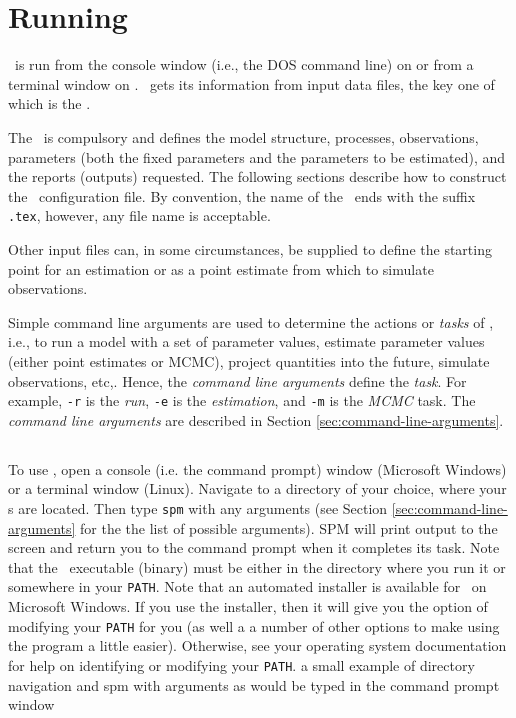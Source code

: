 \section{Running \iSAM\label{sec:running-sam}}
\CH
\iSAM\ is run from the console window (i.e., the DOS command line) on  or from a terminal window on . \iSAM\ gets its information from input data files, the key one of which is the \config{}. 

The \config\ is compulsory and defines the model structure, processes, observations, parameters (both the fixed parameters and the parameters to be estimated), and the reports (outputs) requested. The following sections  describe how to construct the \iSAM\ configuration file. By convention, the name of the \config\ ends with the suffix \texttt{.tex}, however, any file name is acceptable.

Other input files can, in some circumstances, be supplied to define the starting point for an estimation %
or as a point estimate from which to simulate observations.

Simple command line arguments are used to determine the actions or \emph{tasks} of \iSAM, i.e., to run a model with a set of parameter values, estimate parameter values (either point estimates or MCMC), project quantities into the future, simulate observations, etc,. Hence, the \emph{command line arguments} define the \emph{task}. For example, \texttt{-r} is the \emph{run}, \texttt{-e} is the \emph{estimation}, and \texttt{-m} is the \emph{MCMC} task. The \emph{command line arguments} are described in Section \ref{sec:command-line-arguments}.

\subsection{}
\CH
To use \iSAM, open a console (i.e. the command prompt) window (Microsoft Windows) or a terminal window (Linux). Navigate to a directory of your choice, where your \config s are located. Then type \texttt{spm} with any arguments (see Section \ref{sec:command-line-arguments} for the the list of possible arguments). SPM will print output to the screen and return you to the command prompt when it completes its task. Note that the \iSAM\ executable (binary) must be either in the directory where you run it or somewhere in your \texttt{PATH}. Note that an automated installer is available for \iSAM\ on Microsoft Windows. If you use the installer, then it will give you the option of modifying your \texttt{PATH} for you (as well a a number of other options to make using the program a little easier). Otherwise, see your operating system documentation for help on identifying or modifying your \texttt{PATH}.
\EX a small example of directory navigation and spm with arguments as would be typed in the command prompt window  \EXend

